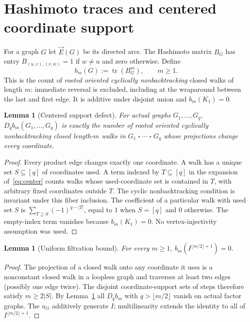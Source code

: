 \documentclass[11pt]{amsart}
\DeclareMathOperator{\tr}{tr}
\newcommand{\sq}{\mathbin{\square}}
\newtheorem{lemma}[theorem]{Lemma}
\theoremstyle{definition}
\theoremstyle{remark}
\begin{document}
\section{Hashimoto traces and centered coordinate support}
For a graph $G$ let $\vec E(G)$ be its directed arcs. The Hashimoto
matrix $B_G$ has entry $B_{(u,v),(v,w)}=1$ if $w\ne u$ and zero otherwise.
Define
\begin{equation}\label{eq:nb}
b_m(G):=\tr(B_G^m),\qquad m\ge1.
\end{equation}
This is the count of \emph{rooted oriented cyclically nonbacktracking}
closed walks of length $m$: immediate reversal is excluded, including at
the wraparound between the last and first edge. It is additive under
disjoint union and $b_m(K_1)=0$.

\begin{lemma}[Centered support defect]\label{lem:support}
For actual graphs $G_1,\ldots,G_q$, $D_q b_m(G_1,\ldots,G_q)$ is exactly the
number of rooted oriented cyclically nonbacktracking closed length-$m$
walks in $G_1\sq\cdots\sq G_q$ whose projections change every coordinate.
\end{lemma}
\begin{proof}
Every product edge changes exactly one coordinate. A walk has a unique set
$S\subseteq[q]$ of coordinates used. A term indexed by
$T\subseteq[q]$ in the expansion of~\eqref{eq:center} counts walks whose
used-coordinate set is contained in $T$, with arbitrary fixed coordinates
outside $T$. The cyclic nonbacktracking condition is invariant under this
fiber inclusion. The coefficient of a particular walk with used set $S$ is
$\sum_{T\supseteq S}(-1)^{q-|T|}$, equal to $1$ when $S=[q]$ and $0$
otherwise. The empty-index term vanishes because $b_m(K_1)=0$.
No vertex-injectivity assumption was used.
\end{proof}

\begin{lemma}[Uniform filtration bound]\label{lem:bound}
For every $m\ge1$, $b_m(I^{\lfloor m/2\rfloor+1})=0$.
\end{lemma}
\begin{proof}
The projection of a closed walk onto any coordinate it uses is a
nonconstant closed walk in a loopless graph and traverses at least two
edges (possibly one edge twice). The disjoint coordinate-support sets of
steps therefore satisfy $m\ge 2|S|$. By Lemma~\ref{lem:support} all
$D_qb_m$ with $q>\lfloor m/2\rfloor$ vanish on actual factor graphs.
The $u_G$ additively generate $I$; multilinearity extends the identity
to all of $I^{\lfloor m/2\rfloor+1}$.
\end{proof}
\end{document}
